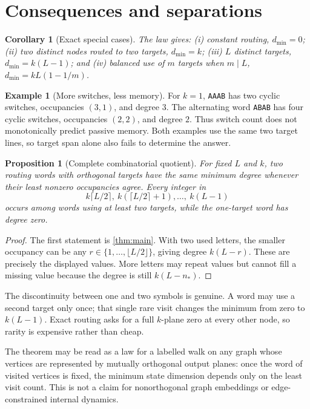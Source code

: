 \documentclass[11pt]{article}
\newtheorem{corollary}[theorem]{Corollary}
\newtheorem{proposition}[theorem]{Proposition}
\theoremstyle{definition}\newtheorem{definition}[theorem]{Definition}\newtheorem{example}[theorem]{Example}
\theoremstyle{remark}\newtheorem{remark}[theorem]{Remark}\newtheorem{limitation}[theorem]{Limitation}
\begin{document}
\section{Consequences and separations}

\begin{corollary}[Exact special cases]\label{cor:special}
The law gives: (i) constant routing, $d_{\min}=0$; (ii) two distinct nodes
routed to two targets, $d_{\min}=k$; (iii) $L$ distinct targets,
$d_{\min}=k(L-1)$; and (iv) balanced use of $m$ targets when $m\mid L$,
$d_{\min}=kL(1-1/m)$.
\end{corollary}

\begin{example}[More switches, less memory]\label{ex:switch}
For $k=1$, \texttt{AAAB} has two cyclic switches, occupancies $(3,1)$, and
degree $3$.  The alternating word \texttt{ABAB} has four cyclic switches,
occupancies $(2,2)$, and degree $2$.  Thus switch count does not monotonically
predict passive memory.  Both examples use the same two target lines, so
target span alone also fails to determine the answer.
\end{example}

\begin{proposition}[Complete combinatorial quotient]\label{prop:quotient}
For fixed $L$ and $k$, two routing words with orthogonal targets have the
same minimum degree whenever their least nonzero occupancies agree.  Every
integer in
\[
                 k\lceil L/2\rceil,\ k(\lceil L/2\rceil+1),
                 \ldots,\ k(L-1)
\]
occurs among words using at least two targets, while the one-target word has
degree zero.
\end{proposition}
\begin{proof}
The first statement is \cref{thm:main}.  With two used letters, the smaller
occupancy can be any $r\in\{1,\ldots,\lfloor L/2\rfloor\}$, giving degree
$k(L-r)$.  These are precisely the displayed values.  More letters may
repeat values but cannot fill a missing value because the degree is still
$k(L-n_*)$.
\end{proof}

The discontinuity between one and two symbols is genuine.  A word may use a
second target only once; that single rare visit changes the minimum from
zero to $k(L-1)$.  Exact routing asks for a full $k$-plane zero at every
other node, so rarity is expensive rather than cheap.

The theorem may be read as a law for a labelled walk on any graph whose
vertices are represented by mutually orthogonal output planes: once the
word of visited vertices is fixed, the minimum state dimension depends only
on the least visit count.  This is not a claim for nonorthogonal graph
embeddings or edge-constrained internal dynamics.
\end{document}
